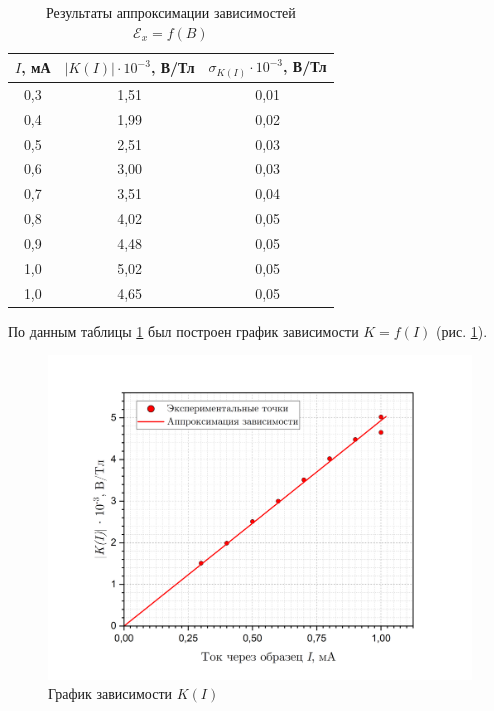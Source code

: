 \documentclass[a4paper, 12pt]{article}
\begin{document}
    \begin{table}[H]
        \centering
        \begin{tabular}{|c|c|c|}
        \hline
        $I$, мА & $\lvert K(I) \rvert \cdot 10^{-3}$, В/Тл  & $\sigma_{K(I)} \cdot 10^{-3}$, В/Тл  \\ \hline
        0,3 & 1,51 & 0,01 \\ \hline
        0,4 & 1,99 & 0,02 \\ \hline
        0,5 & 2,51 & 0,03 \\ \hline
        0,6 & 3,00 & 0,03 \\ \hline
        0,7 & 3,51 & 0,04 \\ \hline
        0,8 & 4,02 & 0,05 \\ \hline
        0,9 & 4,48 & 0,05 \\ \hline
        1,0 & 5,02 & 0,05 \\ \hline
        1,0 & 4,65 & 0,05 \\ \hline
        \end{tabular}
        \caption{Результаты аппроксимации зависимостей $\mathcal{E}_x = f(B)$}
        \label{table_approx}
    \end{table}

    По данным таблицы \ref{table_approx} был построен график зависимости $K = f(I)$ (рис. \ref{graph:k}).

    \begin{figure}[H]
        \centering
        \includegraphics[width = 15 cm]{images/graph_k.png}
        \caption{График зависимости $K(I)$}
        \label{graph:k}
    \end{figure}
\end{document}
